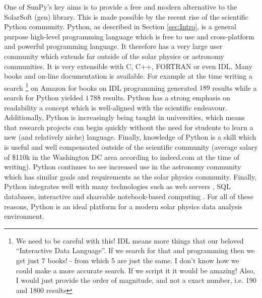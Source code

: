 One of SunPy's key aims is to provide a free and modern alternative to the 
SolarSoft (gen) library. This is made possible by the recent rise of the 
scientific Python community. Python, as described in Section \ref{sec:Intro}, 
is a general purpose high-level programming language which is free to use and 
cross-platform and powerful programming language.
It therefore has a very large user community which extends far outside of the 
solar physics or astronomy communities. It is very extensible with C, C++, 
FORTRAN or even IDL. Many books and on-line documentation is available. For 
example at the time writing a search 
%
\footnote{We need to be careful with this! IDL means more things that our 
beloved ``Interactive Data Language''. If we search for that and programming 
then we get just 7 books! - from which 5 are just the same. I don't know how we 
could make a more accurate search.
If we script it it would be amazing!  Also, I would just provide the order
of magnitude, and not a exact number, i.e. 190 and 1800 results} 
%
on Amazon for books on IDL programming generated $189$ results while a search 
for Python yielded $1\,788$ results. Python has a strong emphasis on 
readability a concept which is well-aligned with the scientific endeavour.
Additionally, Python is increasingly being taught in universities, which means 
that research projects can begin quickly without the need for students to learn 
a new (and relatively niche) language. Finally, knowledge of Python is a skill 
which is useful and well compensated outside of the scientific community 
(average salary of \$110k in the Washington DC area according to indeed.com at 
the time of writing). Python continues to see increased use in the astronomy 
community \citep{greenfield2011} which has similar goals and requirements as 
the solar physics community. Finally, Python integrates well with many 
technologies such as web servers \citep{dolgert2008}, SQL databases, 
interactive and shareable notebook-based computing \citep{perez2007}. For all 
of these reasons, Python is an ideal platform for a modern solar physics data 
analysis environment.


